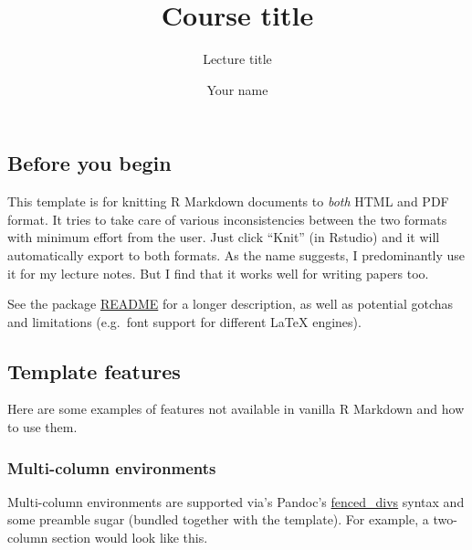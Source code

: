 \documentclass[
]{article}
\title{Course title}
\subtitle{Lecture title}
\author[]{Your name}
\affil{University
\textbar{} Course code}
\date{}
\begin{document}
\maketitle

{
\hypersetup{linkcolor=}
\setcounter{tocdepth}{3}
\tableofcontents
}
\hypertarget{before-you-begin}{%
\subsection{Before you begin}\label{before-you-begin}}

This template is for knitting R Markdown documents to \emph{both} HTML
and PDF format. It tries to take care of various inconsistencies between
the two formats with minimum effort from the user. Just click ``Knit''
(in Rstudio) and it will automatically export to both formats. As the
name suggests, I predominantly use it for my lecture notes. But I find
that it works well for writing papers too.

See the package
\href{https://github.com/grantmcdermott/lecturenotes/blob/master/README.md}{README}
for a longer description, as well as potential gotchas and limitations
(e.g.~font support for different LaTeX engines).

\hypertarget{template-features}{%
\subsection{Template features}\label{template-features}}

Here are some examples of features not available in vanilla R Markdown
and how to use them.

\hypertarget{multi-column-environments}{%
\subsubsection{Multi-column
environments}\label{multi-column-environments}}

Multi-column environments are supported via's Pandoc's
\href{https://pandoc.org/MANUAL.html\#extension-fenced_divs}{fenced\_divs}
syntax and some preamble sugar (bundled together with the template). For
example, a two-column section would look like this.
\end{document}
